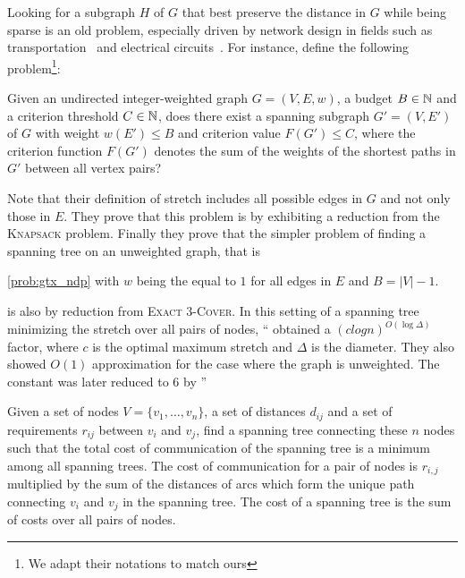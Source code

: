 \label{sub:gtx_state_of_the_art}
Looking for a subgraph $H$ of $G$ that best preserve the distance in $G$ while being sparse is an old
problem, especially driven by network design in fields such as transportation~\autocite{RoadNetworks60}
and electrical circuits~\autocite{electricalNetworks60}. For instance, \textcite{Johnson1978} define
the following problem\footnote{We adapt their notations to match ours}:  
\begin{problem}
  \label{prob:gtx_ndp}
  Given an undirected integer-weighted graph $G=(V, E, w)$, a budget $B\in\mathbb{N}$ and a criterion
  threshold $C\in \mathbb{N}$, does there exist a spanning subgraph $G'=(V, E')$ of $G$ with weight
  $w(E') \leq B$ and criterion value $F(G') \leq C$, where the criterion function $F(G')$ denotes
  the sum of the weights of the shortest paths in $G'$ between all vertex pairs?
\end{problem}
Note that their definition of stretch includes all possible edges in $G$ and not only those in $E$.
They prove that this problem is \NPc{} by exhibiting a reduction from the \textsc{Knapsack}
problem. Finally they prove that the simpler problem of finding a spanning tree on an unweighted
graph, that is
\vspace{-.5\baselineskip}
\begin{problem}
  \autoref{prob:gtx_ndp} with $w$ being the equal to $1$ for all edges in $E$ and $B=|V|-1$.
\end{problem}%
\vspace{-.5\baselineskip}
\noindent is also \NPc{} by reduction from \textsc{Exact 3-Cover}.
In this setting of a spanning tree minimizing the stretch over all pairs of nodes, \enquote{
\textcite{AllPairStrech08} obtained a $(c log n)^{O(\log \Delta)}$ factor, where $c$ is the optimal
maximum stretch and $\Delta$ is the diameter.  They also showed $O(1)$ approximation for the case
where the graph is unweighted. The constant was later reduced to $6$ by \textcite{AllPairStrech10}}

\begin{problem}
Given a set of nodes $V=\{v_1, \ldots, v_n\}$, a set of distances $d_{ij}$ and a set of requirements
$r_{ij}$ between $v_i$ and $v_j$, find a spanning tree connecting these $n$ nodes such that the
total cost of communication of the spanning tree is a minimum among all spanning trees. The cost of
communication for a pair of nodes is $r_{i,j}$ multiplied by the sum of the distances of arcs which
form the unique path connecting $v_i$ and $v_j$ in the spanning tree. The cost of a spanning tree is
the sum of costs over all pairs of nodes.
\end{problem}

